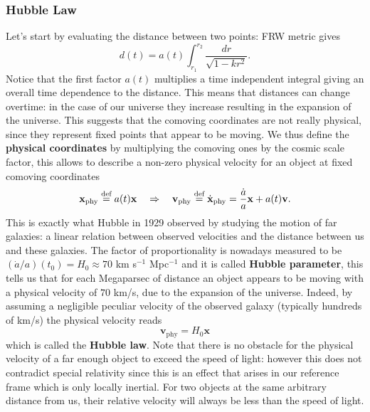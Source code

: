 \subsubsection{Hubble Law}
Let's start by evaluating the distance between two points: FRW metric gives 
$$d(t)=a(t)\int_{r_1}^{r_2}\frac{dr}{\sqrt{1-kr^2}}.$$
Notice that the first factor $a(t)$ multiplies a time independent integral giving an overall time dependence to the distance. This means that distances can change overtime: in the case of our universe they increase resulting in the expansion of the universe. This suggests that the comoving coordinates are not really physical, since they represent fixed points that appear to be moving. We thus define the \textbf{physical coordinates} by multiplying the comoving ones by the cosmic scale factor, this allows to describe a non-zero physical velocity for an object at fixed comoving coordinates
$$\mathbf{x}_\text{phy}\stackrel{\text{def}}{=} a(t)\mathbf{x} \quad\Rightarrow\quad \mathbf{v}_\text{phy}\stackrel{\text{def}}{=}\dot{\mathbf{x}}_\text{phy}=\frac{\dot a}{a} \mathbf{x}+a(t)\mathbf{v}.$$
This is exactly what Hubble in 1929 \cite{1929PNAS...15..168H} observed by studying the motion of far galaxies: a linear relation between observed velocities and the distance between us and these galaxies. The factor of proportionality is nowadays measured to be $(\dot a/a)(t_0)=H_0\approx70$ km s$^{-1}$ Mpc$^{-1}$ and it is called \textbf{Hubble parameter}, this tells us that for each Megaparsec of distance an object appears to be moving with a physical velocity of $70$ km/s, due to the expansion of the universe. Indeed, by assuming a negligible peculiar velocity of the observed galaxy (typically hundreds of km/s) the physical velocity reads
\begin{equation}
    \label{eq:Hubble_Law}
    \mathbf{v}_\text{phy}=H_0\mathbf{x}
\end{equation}
which is called the \textbf{Hubble law}. Note that there is no obstacle for the physical velocity of a far enough object to exceed the speed of light: however this does not contradict special relativity since this is an effect that arises in our reference frame which is only locally inertial. For two objects at the same arbitrary distance from us, their relative velocity will always be less than the speed of light.

